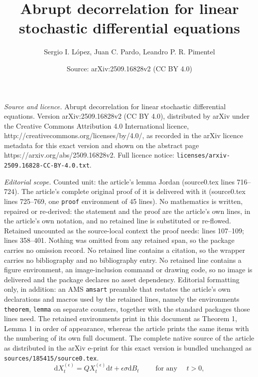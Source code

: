 \documentclass[10pt,a4paper]{amsart}
\title{Abrupt decorrelation for linear stochastic differential equations}
\author{Sergio I. L\'opez, Juan C. Pardo, Leandro P. R. Pimentel}
\date{Source: arXiv:2509.16828v2 (CC BY 4.0)}
\newcommand{\ud}{\mathrm{d}}
\begin{document}
\maketitle

\noindent\emph{Source and licence.} Abrupt decorrelation for linear stochastic differential equations. Version arXiv:2509.16828v2 (CC BY 4.0), distributed by arXiv under the Creative Commons Attribution 4.0 International licence, http://creativecommons.org/licenses/by/4.0/, as recorded in the arXiv licence metadata for this exact version and shown on the abstract page https://arxiv.org/abs/2509.16828v2. Full licence notice: \texttt{licenses/arxiv-2509.16828-CC-BY-4.0.txt}.\par\smallskip

\noindent\textit{Editorial scope.} Counted unit: the article's lemma Jordan (source0.tex lines 716--724). The article's complete original proof of it is delivered with it (source0.tex lines 725--769, one \texttt{proof} environment of 45 lines). No mathematics is written, repaired or re-derived: the statement and the proof are the article's own lines, in the article's own notation, and no retained line is substituted or re-flowed.  Retained uncounted as the source-local context the proof needs: lines 107--109; lines 358--401.  Nothing was omitted from any retained span, so the package carries no omission record.  No retained line contains a citation, so the wrapper carries no bibliography and no bibliography entry.  No retained line contains a figure environment, an image-inclusion command or drawing code, so no image is delivered and the package declares no asset dependency.  Editorial formatting only, in addition: an AMS \texttt{amsart} preamble that restates the article's own declarations and macros used by the retained lines, namely the environments \texttt{theorem}, \texttt{lemma} on separate counters, together with the standard packages those lines need.  The retained environments print in this document as Theorem 1, Lemma 1 in order of appearance, whereas the article prints the same items with the numbering of its own full document.  The complete native source of the article as distributed in the arXiv e-print for this exact version is bundled unchanged as \texttt{sources/185415/source0.tex}.
\begin{equation}\label{SDE}
\ud X^{(\epsilon)}_t =QX^{(\epsilon)}_t \ud t +\epsilon \sigma \ud B_t\qquad \textrm{ for any }\quad t>0,
\end{equation}
\end{document}
